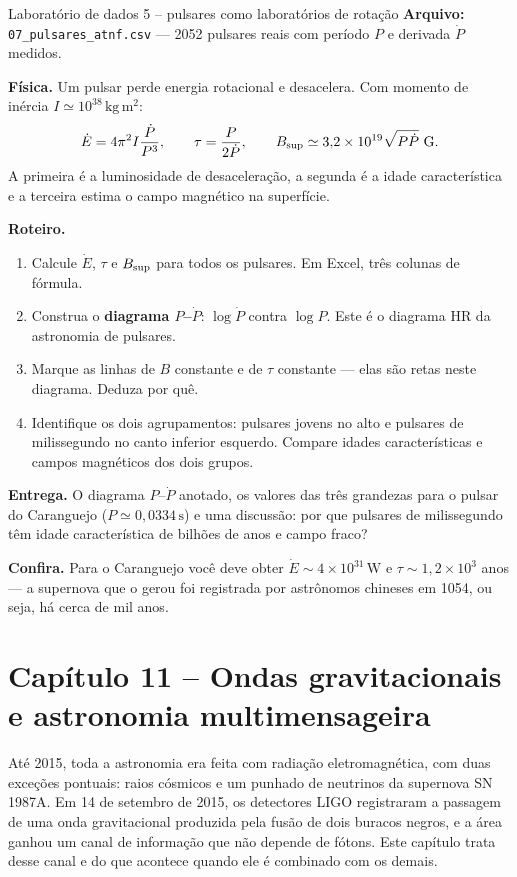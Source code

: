 \documentclass[11pt,a4paper]{article}
\begin{document}
\begin{lessonblock}[borderline west={2pt}{0pt}{astroGold}]{Laboratório de dados 5 -- pulsares como laboratórios de rotação}
\textbf{Arquivo:} \texttt{07\_pulsares\_atnf.csv} --- 2052 pulsares reais com período $P$ e derivada $\dot{P}$ medidos.

\textbf{Física.} Um pulsar perde energia rotacional e desacelera. Com momento de inércia $I\simeq10^{38}\,\mathrm{kg\,m^{2}}$:
\[
\dot{E}=4\pi^{2}I\frac{\dot{P}}{P^{3}},\qquad
\tau=\frac{P}{2\dot{P}},\qquad
B_{\rm sup}\simeq3{,}2\times10^{19}\sqrt{P\dot{P}}\ \mathrm{G}.
\]
A primeira é a luminosidade de desaceleração, a segunda é a idade característica e a terceira estima o campo magnético na superfície.

\textbf{Roteiro.}
\begin{enumerate}
\item Calcule $\dot{E}$, $\tau$ e $B_{\rm sup}$ para todos os pulsares. Em Excel, três colunas de fórmula.
\item Construa o \textbf{diagrama $P$--$\dot{P}$}: $\log\dot{P}$ contra $\log P$. Este é o diagrama HR da astronomia de pulsares.
\item Marque as linhas de $B$ constante e de $\tau$ constante --- elas são retas neste diagrama. Deduza por quê.
\item Identifique os dois agrupamentos: pulsares jovens no alto e pulsares de milissegundo no canto inferior esquerdo. Compare idades características e campos magnéticos dos dois grupos.
\end{enumerate}

\textbf{Entrega.} O diagrama $P$--$\dot{P}$ anotado, os valores das três grandezas para o pulsar do Caranguejo ($P\simeq0{,}0334\,\mathrm{s}$) e uma discussão: por que pulsares de milissegundo têm idade característica de bilhões de anos e campo fraco?

\textbf{Confira.} Para o Caranguejo você deve obter $\dot{E}\sim4\times10^{31}\,\mathrm{W}$ e $\tau\sim1{,}2\times10^{3}$ anos --- a supernova que o gerou foi registrada por astrônomos chineses em 1054, ou seja, há cerca de mil anos.
\end{lessonblock}

\newpage
\section*{Capítulo 11 -- Ondas gravitacionais e astronomia multimensageira}
Até 2015, toda a astronomia era feita com radiação eletromagnética, com duas exceções pontuais: raios cósmicos e um punhado de neutrinos da supernova SN\,1987A. Em 14 de setembro de 2015, os detectores LIGO registraram a passagem de uma onda gravitacional produzida pela fusão de dois buracos negros, e a área ganhou um canal de informação que não depende de fótons. Este capítulo trata desse canal e do que acontece quando ele é combinado com os demais.
\end{document}
